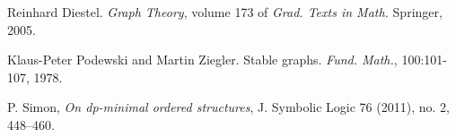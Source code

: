 \documentclass{amsart}
\begin{document}
\begin{thebibliography}{9}

	Reinhard Diestel. \textit{Graph Theory}, volume 173 of \textit{Grad. Texts in Math.} Springer, 2005.

	Klaus-Peter Podewski and Martin Ziegler. Stable graphs. \textit{Fund. Math.}, 100:101-107, 1978.
	
	P. Simon, \textit{On dp-minimal ordered structures}, J. Symbolic Logic 76 (2011), no. 2, 448–460.

\end{thebibliography}
\end{document}
